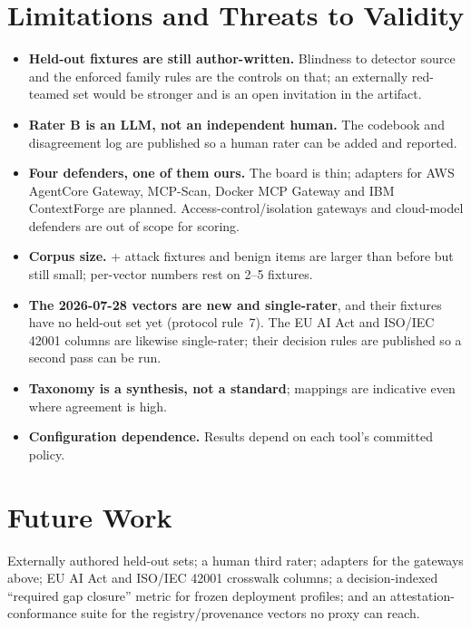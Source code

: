 \documentclass[conference]{IEEEtran}
\newcommand{\rev}{2026-07-28}
\begin{document}
\section{Limitations and Threats to Validity}\label{sec:limits}
\begin{itemize}
\item \textbf{Held-out fixtures are still author-written.} Blindness to detector source and the enforced family rules are the controls on that; an externally red-teamed set would be stronger and is an open invitation in the artifact.
\item \textbf{Rater B is an LLM, not an independent human.} The codebook and disagreement log are published so a human rater can be added and reported.
\item \textbf{Four defenders, one of them ours.} The board is thin; adapters for AWS AgentCore Gateway, MCP-Scan, Docker MCP Gateway and IBM ContextForge are planned. Access-control/isolation gateways and cloud-model defenders are out of scope for scoring.
\item \textbf{Corpus size.} \nDev+\nHeldout{} attack fixtures and \nBenign{} benign items are larger than before but still small; per-vector numbers rest on 2--5 fixtures.
\item \textbf{The \rev{} vectors are new and single-rater}, and their fixtures have no held-out set yet (protocol rule~7). The EU AI Act and ISO/IEC 42001 columns are likewise single-rater; their decision rules are published so a second pass can be run.
\item \textbf{Taxonomy is a synthesis, not a standard}; mappings are indicative even where agreement is high.
\item \textbf{Configuration dependence.} Results depend on each tool's committed policy.
\end{itemize}

\section{Future Work}\label{sec:future}
Externally authored held-out sets; a human third rater; adapters for the gateways above; EU AI Act and ISO/IEC 42001 crosswalk columns; a decision-indexed ``required gap closure'' metric for frozen deployment profiles; and an attestation-conformance suite for the registry/provenance vectors no proxy can reach.
\end{document}
